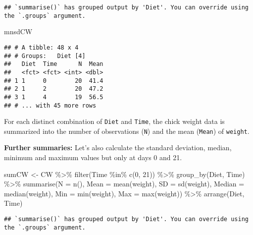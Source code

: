 \documentclass[
]{book}
\newenvironment{Shaded}{\begin{snugshade}}{\end{snugshade}}
\newcommand{\AttributeTok}[1]{\textcolor[rgb]{0.77,0.63,0.00}{#1}}
\newcommand{\DecValTok}[1]{\textcolor[rgb]{0.00,0.00,0.81}{#1}}
\newcommand{\FunctionTok}[1]{\textcolor[rgb]{0.00,0.00,0.00}{#1}}
\newcommand{\NormalTok}[1]{#1}
\newcommand{\OtherTok}[1]{\textcolor[rgb]{0.56,0.35,0.01}{#1}}
\newcommand{\SpecialCharTok}[1]{\textcolor[rgb]{0.00,0.00,0.00}{#1}}
\begin{document}
\begin{verbatim}
## `summarise()` has grouped output by 'Diet'. You can override using the `.groups` argument.
\end{verbatim}

\begin{Shaded}
\begin{Highlighting}[]
\NormalTok{mnsdCW}
\end{Highlighting}
\end{Shaded}

\begin{verbatim}
## # A tibble: 48 x 4
## # Groups:   Diet [4]
##   Diet  Time      N  Mean
##   <fct> <fct> <int> <dbl>
## 1 1     0        20  41.4
## 2 1     2        20  47.2
## 3 1     4        19  56.5
## # ... with 45 more rows
\end{verbatim}

For each distinct combination of \texttt{Diet} and \texttt{Time}, the chick weight data is summarized
into the number of observations (\texttt{N}) and the mean (\texttt{Mean}) of \texttt{weight}.

\textbf{Further summaries:} Let's also calculate the standard deviation, median, minimum and maximum values but only
at days 0 and 21.

\begin{Shaded}
\begin{Highlighting}[]
\NormalTok{sumCW }\OtherTok{\textless{}{-}}\NormalTok{  CW }\SpecialCharTok{\%\textgreater{}\%} 
  \FunctionTok{filter}\NormalTok{(Time }\SpecialCharTok{\%in\%} \FunctionTok{c}\NormalTok{(}\DecValTok{0}\NormalTok{, }\DecValTok{21}\NormalTok{)) }\SpecialCharTok{\%\textgreater{}\%} 
  \FunctionTok{group\_by}\NormalTok{(Diet, Time) }\SpecialCharTok{\%\textgreater{}\%} 
  \FunctionTok{summarise}\NormalTok{(}\AttributeTok{N =} \FunctionTok{n}\NormalTok{(),}
            \AttributeTok{Mean =} \FunctionTok{mean}\NormalTok{(weight),}
            \AttributeTok{SD =} \FunctionTok{sd}\NormalTok{(weight),}
            \AttributeTok{Median =} \FunctionTok{median}\NormalTok{(weight),}
            \AttributeTok{Min =} \FunctionTok{min}\NormalTok{(weight),}
            \AttributeTok{Max =} \FunctionTok{max}\NormalTok{(weight)) }\SpecialCharTok{\%\textgreater{}\%} 
  \FunctionTok{arrange}\NormalTok{(Diet, Time)}
\end{Highlighting}
\end{Shaded}

\begin{verbatim}
## `summarise()` has grouped output by 'Diet'. You can override using the `.groups` argument.
\end{verbatim}
\end{document}
